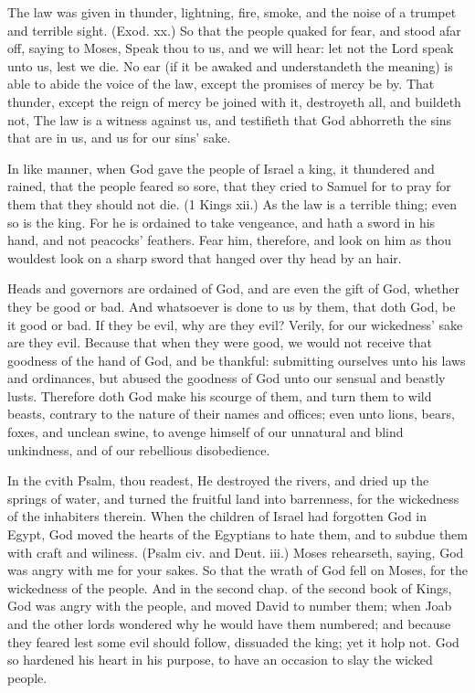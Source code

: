 The law was given in thunder, lightning, fire, smoke, 
and the noise of a trumpet and terrible sight. (Exod. xx.)
So that the people quaked for fear, and stood afar off,
saying to Moses, Speak thou to us, and we will hear:
let not the Lord speak unto us, lest we die. No ear (if 
it be awaked and understandeth the meaning) is able to 
abide the voice of the law, except the promises of mercy 
be by. That thunder, except the reign of mercy be joined 
with it, destroyeth all, and buildeth not, The law is a 
witness against us, and testifieth that God abhorreth the 
sins that are in us, and us for our sins' sake.

In like manner, when God gave the people of Israel 
a king, it thundered and rained, that the people feared 
so sore, that they cried to Samuel for to pray for them 
that they should not die. (1 Kings xii.) As the law is a 
terrible thing; even so is the king. For he is ordained 
to take vengeance, and hath a sword in his hand, and not 
peacocks' feathers. Fear him, therefore, and look on
him as thou wouldest look on a sharp sword that hanged 
over thy head by an hair.

Heads and governors are ordained of God, and are 
even the gift of God, whether they be good or bad. And 
whatsoever is done to us by them, that doth God, be it 
good or bad. If they be evil, why are they evil? Verily, 
for our wickedness' sake are they evil. Because that when 
they were good, we would not receive that goodness of the 
hand of God, and be thankful: submitting ourselves unto 
his laws and ordinances, but abused the goodness of God 
unto our sensual and beastly lusts. Therefore doth God 
make his scourge of them, and turn them to wild beasts, 
contrary to the nature of their names and offices; even
unto lions, bears, foxes, and unclean swine, to avenge
himself of our unnatural and blind unkindness, and of 
our rebellious disobedience. 

In the cvith Psalm, thou readest, He destroyed the 
rivers, and dried up the springs of water, and turned the 
fruitful land into barrenness, for the wickedness of the inhabiters
therein. When the children of Israel had forgotten
God in Egypt, God moved the hearts of the 
Egyptians to hate them, and to subdue them with craft 
and wiliness. (Psalm civ. and Deut. iii.) Moses rehearseth,
saying, God was angry with me for your 
sakes. So that the wrath of God fell on Moses, for the 
wickedness of the people. And in the second chap. of 
the second book of Kings, God was angry with the people, 
and moved David to number them; when Joab and the 
other lords wondered why he would have them numbered;
and because they feared lest some evil should follow, dissuaded
the king; yet it holp not. God so hardened his 
heart in his purpose, to have an occasion to slay the wicked 
people. 

